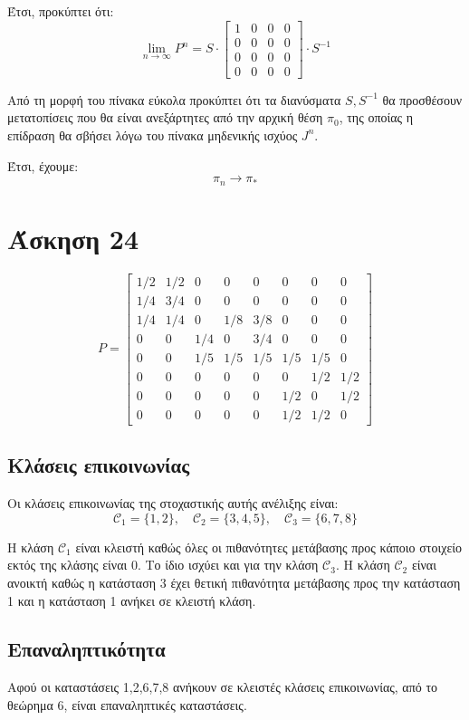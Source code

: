 \documentclass[a4paper,oneside, 11pt]{article}
\begin{document}
Έτσι, προκύπτει ότι:
$$
\lim_{n\to \infty}P^n = S \cdot \begin{bmatrix}
1 & 0 & 0 & 0 \\
0 & 0 & 0 & 0\\
0 & 0 & 0 & 0 \\
0 & 0 & 0 & 0
\end{bmatrix}\cdot S^{-1}
$$


Από τη μορφή του πίνακα εύκολα προκύπτει ότι τα διανύσματα $S, S^{-1}$ θα προσθέσουν μετατοπίσεις που θα είναι ανεξάρτητες από την αρχική θέση $\pi_0$, της οποίας η επίδραση θα σβήσει λόγω του πίνακα μηδενικής ισχύος $J^n$.

Έτσι, έχουμε:
$$
\pi_n \to \pi_*
$$





\section*{Άσκηση 24}
$$
P = \begin{bmatrix}
1/2 & 1/2 & 0 & 0 & 0 & 0 & 0 & 0 \\
1/4 & 3/4 & 0 & 0 & 0 & 0 & 0 & 0 \\
1/4 & 1/4 & 0 & 1/8 & 3/8 & 0 & 0 & 0 \\
0 & 0 & 1/4 & 0 & 3/4 & 0 & 0 & 0 \\
0 & 0 & 1/5 & 1/5 & 1/5 & 1/5 & 1/5 & 0 \\
0 & 0 & 0 & 0 & 0 & 0 & 1/2 & 1/2 \\
0 & 0 & 0 & 0 & 0 & 1/2 & 0 & 1/2 \\
0 & 0 & 0 & 0 & 0 & 1/2 & 1/2 & 0 
\end{bmatrix}
$$


\subsection*{Κλάσεις επικοινωνίας}
Οι κλάσεις επικοινωνίας της στοχαστικής αυτής ανέλιξης είναι:
$$
\mathcal C_1 = \{1, 2\}, \quad \mathcal C_2 = \{3,4,5\}, \quad \mathcal C_3 = \{6,7,8\}
$$

Η κλάση $\mathcal C_{1}$ είναι κλειστή καθώς όλες οι πιθανότητες μετάβασης προς κάποιο στοιχείο εκτός της κλάσης είναι 0. Το ίδιο ισχύει και για την κλάση $\mathcal C_3$. Η κλάση $\mathcal C_2$ είναι ανοικτή καθώς η κατάσταση 3 έχει θετική πιθανότητα μετάβασης προς την κατάσταση 1 και η κατάσταση 1 ανήκει σε κλειστή κλάση. 

\subsection*{Επαναληπτικότητα}
Αφού οι καταστάσεις 1,2,6,7,8 ανήκουν σε κλειστές κλάσεις επικοινωνίας, από το θεώρημα 6, είναι επαναληπτικές καταστάσεις. 
\end{document}
